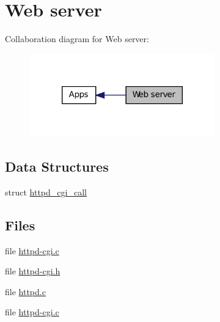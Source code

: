 \hypertarget{group__httpd}{
\section{Web server}
\label{group__httpd}
}


Collaboration diagram for Web server:
\nopagebreak
\begin{figure}[H]
\begin{center}
\leavevmode
\includegraphics[width=228pt]{group__httpd}
\end{center}
\end{figure}


\subsection*{Data Structures}
\begin{DoxyCompactItemize}
\item 
struct \hyperlink{structhttpd__cgi__call}{httpd\_\-cgi\_\-call}
\end{DoxyCompactItemize}
\subsection*{Files}
\begin{DoxyCompactItemize}
\item 
file \hyperlink{httpd-cgi_8c}{httpd-\/cgi.c}
\item 
file \hyperlink{httpd-cgi_8h}{httpd-\/cgi.h}
\item 
file \hyperlink{httpd_8c}{httpd.c}
\item 
file \hyperlink{old__page_2httpd-cgi_8c}{httpd-\/cgi.c}
\end{DoxyCompactItemize}

